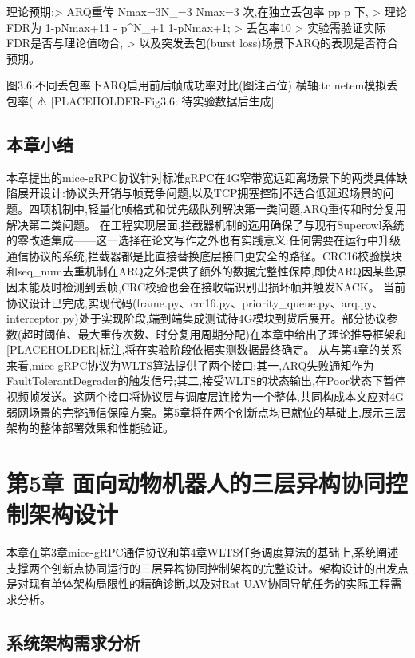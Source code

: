 理论预期:> ARQ重传 Nmax⁡=3N_{\max}=3
Nmax​=3 次,在独立丢包率 pp
p 下,
> 理论FDR为 1-pNmax⁡+11 - p^{N_{\max}+1}
1-pNmax​+1;
> 丢包率10%
> 实验需验证实际FDR是否与理论值吻合,
> 以及突发丢包(burst loss)场景下ARQ的表现是否符合预期。



图3.6:不同丢包率下ARQ启用前后帧成功率对比(图注占位)
横轴:tc netem模拟丢包率(%
⚠️ [PLACEHOLDER-Fig3.6: 待实验数据后生成]

\section{本章小结}

本章提出的mice-gRPC协议针对标准gRPC在4G窄带宽远距离场景下的两类具体缺陷展开设计:协议头开销与帧竞争问题,以及TCP拥塞控制不适合低延迟场景的问题。四项机制中,轻量化帧格式和优先级队列解决第一类问题,ARQ重传和时分复用解决第二类问题。
在工程实现层面,拦截器机制的选用确保了与现有Superowl系统的零改造集成——这一选择在论文写作之外也有实践意义:任何需要在运行中升级通信协议的系统,拦截器都是比直接替换底层接口更安全的路径。CRC16校验模块和seq_num去重机制在ARQ之外提供了额外的数据完整性保障,即使ARQ因某些原因未能及时检测到丢帧,CRC校验也会在接收端识别出损坏帧并触发NACK。
当前协议设计已完成,实现代码(frame.py、crc16.py、priority_queue.py、arq.py、interceptor.py)处于实现阶段,端到端集成测试待4G模块到货后展开。部分协议参数(超时阈值、最大重传次数、时分复用周期分配)在本章中给出了理论推导框架和[PLACEHOLDER]标注,将在实验阶段依据实测数据最终确定。
从与第4章的关系来看,mice-gRPC协议为WLTS算法提供了两个接口:其一,ARQ失败通知作为FaultTolerantDegrader的触发信号;其二,接受WLTS的状态输出,在Poor状态下暂停视频帧发送。这两个接口将协议层与调度层连接为一个整体,共同构成本文应对4G弱网场景的完整通信保障方案。第5章将在两个创新点均已就位的基础上,展示三层架构的整体部署效果和性能验证。

\chapter{第5章 面向动物机器人的三层异构协同控制架构设计}
本章在第3章mice-gRPC通信协议和第4章WLTS任务调度算法的基础上,系统阐述支撑两个创新点协同运行的三层异构协同控制架构的完整设计。架构设计的出发点是对现有单体架构局限性的精确诊断,以及对Rat-UAV协同导航任务的实际工程需求分析。

\section{系统架构需求分析}
